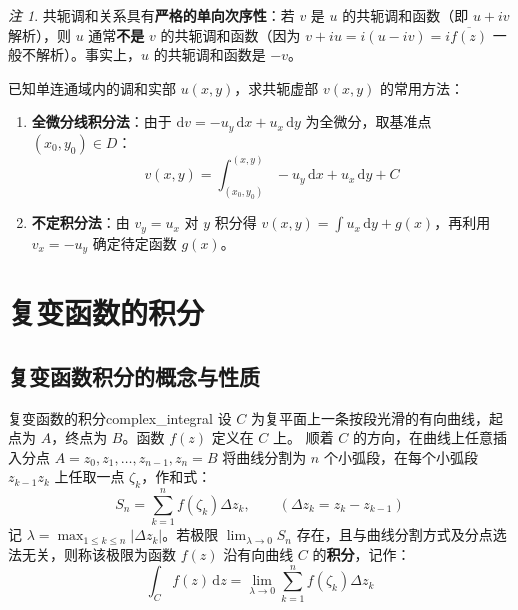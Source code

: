 \documentclass[11pt,a4paper,fontset=fandol]{ctexart}
\theoremstyle{remark}
\newtheorem{remark}{注}[section]
\begin{document}
\begin{remark}
共轭调和关系具有\textbf{严格的单向次序性}：若 $v$ 是 $u$ 的共轭调和函数（即 $u + iv$ 解析），则 $u$ 通常\textbf{不是} $v$ 的共轭调和函数（因为 $v + iu = i(u - iv) = i\overline{f(z)}$ 一般不解析）。事实上，$u$ 的共轭调和函数是 $-v$。
\end{remark}

已知单连通域内的调和实部 $u(x, y)$，求共轭虚部 $v(x, y)$ 的常用方法：
\begin{enumerate}
    \item \textbf{全微分线积分法}：由于 $\mathrm{d}v = -u_y\,\mathrm{d}x + u_x\,\mathrm{d}y$ 为全微分，取基准点 $(x_0, y_0) \in D$：
    \begin{equation}
        v(x, y) = \int_{(x_0, y_0)}^{(x, y)} -u_y\,\mathrm{d}x + u_x\,\mathrm{d}y + C
    \end{equation}
    \item \textbf{不定积分法}：由 $v_y = u_x$ 对 $y$ 积分得 $v(x, y) = \int u_x\,\mathrm{d}y + g(x)$，再利用 $v_x = -u_y$ 确定待定函数 $g(x)$。
\end{enumerate}

\section{复变函数的积分}

\subsection{复变函数积分的概念与性质}

\begin{definition}{复变函数的积分}{complex_integral}
设 $C$ 为复平面上一条按段光滑的有向曲线，起点为 $A$，终点为 $B$。函数 $f(z)$ 定义在 $C$ 上。
顺着 $C$ 的方向，在曲线上任意插入分点 $A = z_0, z_1, \dots, z_{n-1}, z_n = B$ 将曲线分割为 $n$ 个小弧段，在每个小弧段 $z_{k-1}z_k$ 上任取一点 $\zeta_k$，作和式：
\begin{equation}
    S_n = \sum_{k=1}^n f(\zeta_k)\Delta z_k, \qquad (\Delta z_k = z_k - z_{k-1})
\end{equation}
记 $\lambda = \max_{1 \le k \le n} |\Delta z_k|$。若极限 $\lim_{\lambda \to 0} S_n$ 存在，且与曲线分割方式及分点选法无关，则称该极限为函数 $f(z)$ 沿有向曲线 $C$ 的\textbf{积分}，记作：
\begin{equation}
    \int_C f(z)\,\mathrm{d}z = \lim_{\lambda \to 0} \sum_{k=1}^n f(\zeta_k)\Delta z_k
\end{equation}
\end{definition}
\end{document}
